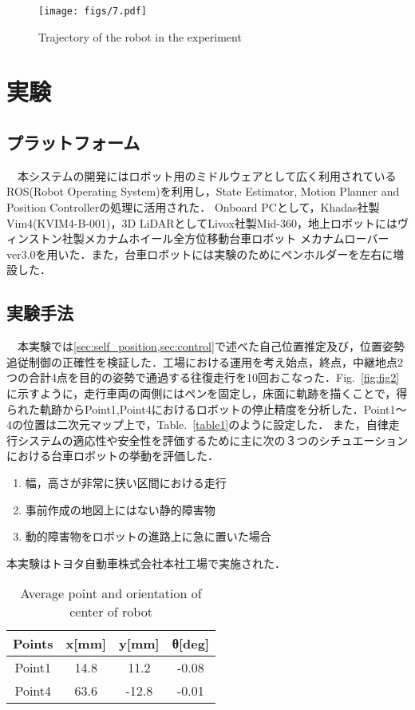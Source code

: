 \begin{figure}[!t]
\texttt{[image: figs/7.pdf]}
\caption{Trajectory of the robot in the experiment}
\label{fig:fig7}
\end{figure}

\section{実験}

\subsection{プラットフォーム}
　本システムの開発にはロボット用のミドルウェアとして広く利用されているROS(Robot Operating System)を利用し，State Estimator, Motion Planner and Position Controllerの処理に活用された．
Onboard PCとして，Khadas社製Vim4(KVIM4-B-001)，3D LiDARとしてLivox社製Mid-360，地上ロボットにはヴィンストン社製メカナムホイール全方位移動台車ロボット メカナムローバー ver3.0を用いた．また，台車ロボットには実験のためにペンホルダーを左右に増設した．

\subsection{実験手法}
　本実験では\ref{sec:self_position,sec:control}で述べた自己位置推定及び，位置姿勢追従制御の正確性を検証した．工場における運用を考え始点，終点，中継地点2つの合計4点を目的の姿勢で通過する往復走行を10回おこなった．Fig.~\ref{fig:fig2}に示すように，走行車両の両側にはペンを固定し，床面に軌跡を描くことで，得られた軌跡からPoint1,Point4におけるロボットの停止精度を分析した．Point1〜4の位置は二次元マップ上で，Table.~\ref{table1}のように設定した．
また，自律走行システムの適応性や安全性を評価するために主に次の３つのシチュエーションにおける台車ロボットの挙動を評価した．
\begin{enumerate}[label=(\alph*)]
  \item 幅，高さが非常に狭い区間における走行
  \item 事前作成の地図上にはない静的障害物
  \item 動的障害物をロボットの進路上に急に置いた場合
\end{enumerate}
本実験はトヨタ自動車株式会社本社工場で実施された． 

\begin{table}[!t]
    \caption{Average point and orientation of center of robot}
    \label{table2}
    \centering
    \begin{tabular}{cccc} \hline
      Points & x[mm] & y[mm] & θ[deg]\\
      \hline \hline
      Point1 & 14.8 & 11.2 & -0.08\\
      Point4 & 63.6 & -12.8 & -0.01\\
      \hline
    \end{tabular}
\end{table}

